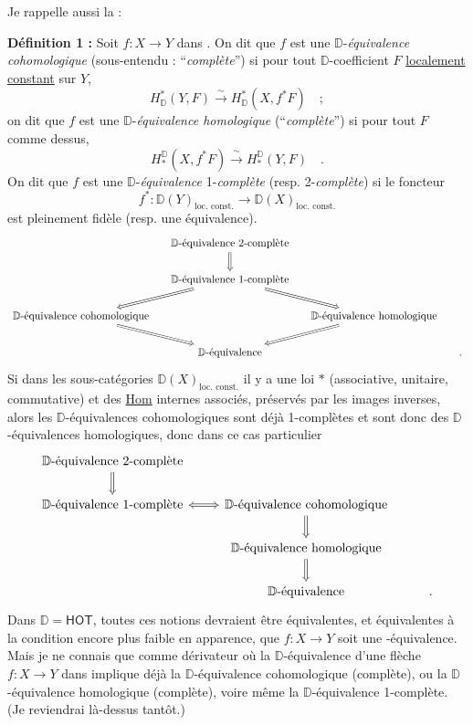 \documentclass[11pt,leqno]{article}
\newcommand{\printedpage}[1]{\marginpar{\footnotesize p.~#1}}
\newcommand{\msp}[1]{\marginpar{\footnotesize [#1]}}
\newcommand{\DD}{\mathbb{D}}
\newcommand{\Dia}{\mathsf{Dia}}
\newcommand{\Hot}{\mathsf{Hot}}
\newcommand{\HOT}{\mathsf{HOT}}
\begin{document}
Je rappelle aussi la :

\textbf{Définition 1 :} Soit $f : X \to Y$ dans \Dia. On dit que $f$ est une $\DD$-\textit{équivalence cohomologique} (sous-entendu : “\textit{complète}”) si pour tout $\DD$-coefficient $F$ \underline{localement} \underline{constant} sur $Y$,
\[ H^{*}_{\DD}(Y,F) \xrightarrow{\ \sim\ } H^{*}_{\DD}(X,f^{*}F) \quad ; \]
on dit que $f$ est une $\DD$-\textit{équivalence homologique} (“\textit{complète}”) si pour tout $F$ comme dessus,
\[ H_{*}^{\DD}(X,f^{*}F) \xrightarrow{\ \sim\ } H_{*}^{\DD}(Y,F) \quad . \]
On dit que $f$ est une $\DD$-\textit{équivalence} 1-\textit{complète} (resp. 2-\textit{complète}) si le foncteur
\[ f^{*} : \DD(Y)_{\text{loc. const.}} \longrightarrow \DD(X)_{\text{loc. const.}} \]
est pleinement fidèle (resp. une équivalence).
\[
\begin{tikzcd}[column sep=small]
 & \text{$\DD$-équivalence 2-complète} \arrow[d, Rightarrow] & & \\
 & \text{$\DD$-équivalence 1-complète} \arrow[dl, Rightarrow] \arrow[dr, Rightarrow] & & \\
\text{$\DD$-équivalence cohomologique} \arrow[dr, Rightarrow] & & \text{$\DD$-équivalence homologique} \arrow[dl, Rightarrow] & \\
 & \text{$\DD$-équivalence} & & .
\end{tikzcd}
\]
Si dans les sous-catégories $\DD(X)_{\text{loc. const.}}$ il y a une loi $*$ (associative, unitaire, commutative) et des \underline{\textsf{Hom}} internes associés, préservés par les images inverses, alors les $\DD$-équivalences cohomologiques sont déjà 1-complètes et sont donc des $\DD$-équivalences homologiques, donc dans ce cas particulier
\printedpage{68}
\msp{page 114: blank}
\msp{page 115}
\[
\begin{tikzcd}
\text{$\DD$-équivalence 2-complète} \arrow[d, Rightarrow] & & \\
\text{$\DD$-équivalence 1-complète} \arrow[r, Leftrightarrow] & \text{$\DD$-équivalence cohomologique} \arrow[d, Rightarrow] & \\
 & \text{$\DD$-équivalence homologique} \arrow[d, Rightarrow] & \\
 & \text{$\DD$-équivalence} & .
\end{tikzcd}
\]
Dans $\DD = \mathsf{HOT}$, toutes ces notions devraient être équivalentes, et équivalentes à la condition encore plus faible en apparence, que $f : X \to Y$ soit une \Hot-équivalence. Mais je ne connais que \HOT{} comme dérivateur où la $\DD$-équivalence d'une flèche $f : X \to Y$ dans \Dia{} implique déjà la $\DD$-équivalence cohomologique (complète), ou la $\DD$-équivalence homologique (complète), voire même la $\DD$-équivalence 1-complète. (Je reviendrai là-dessus tantôt.)
\end{document}
